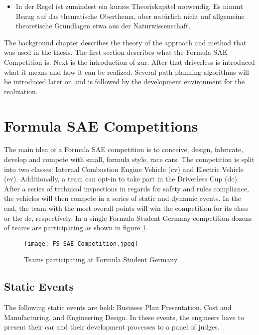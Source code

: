 \begin{itemize}
    \item In der Regel ist zumindest ein kurzes Theoriekapitel notwendig. Es nimmt Bezug auf das thematische Oberthema, aber natürlich nicht auf allgemeine theoretische Grundlagen etwa aus der Naturwissenschaft.
\end{itemize}
The background chapter describes the theory of the approach and method that was used in the thesis. The first section describes what the Formula SAE Competition is. Next is the introduction of \acrlong{zur}. After that driverless is introduced what it means and how it can be realized. Several path planning algorithms will be introduced later on and is followed by the development environment for the realization.

\section{Formula SAE Competitions}
The main idea of a Formula SAE competition is to conceive, design, fabricate, develop and compete with small, formula style, race cars.
The competition is split into two classes: Internal Combustion Engine Vehicle (\acrshort{cv}) and Electric Vehicle (\acrshort{ev}).
Additionally, a team can opt-in to take part in the Driverless Cup (\acrshort{dc}).
After a series of technical inspections in regards for safety and rules compliance, the vehicles will then compete in a series of static and dynamic events. In the end, the team with the most overall points will win the competition for its class or the \acrlong{dc}, respectively. \cite{fs_rules_2022_handbook}
In a single Formula Student Germany competition dozens of teams are participating as shown in figure \ref{fig:FS SAE Competition}.
\begin{figure}[H]
    \centering
    \texttt{[image: FS\_SAE\_Competition.jpeg]}
    \caption{Teams participating at Formula Student Germany \cite{fs_germany}}
    \label{fig:FS SAE Competition}
\end{figure}

\subsection{Static Events}
The following static events are held: Business Plan Presentation, Cost and Manufacturing, and Engineering Design. In these events, the engineers have to present their car and their development processes to a panel of judges. \cite{fs_rules_2022_handbook}

